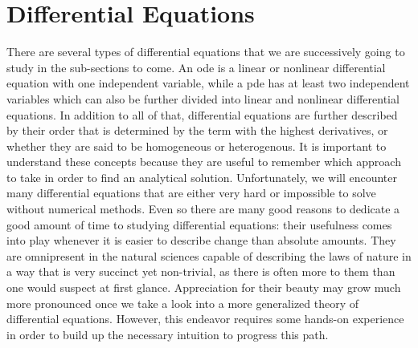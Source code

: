\section{Differential Equations}\label{sec-diff-eq}

There are several types of differential equations that we are successively going
to study in the sub-sections to come. An \gls{ode} is a linear or nonlinear
differential equation with one independent variable, while a \gls{pde} has at least
two independent variables which can also be further divided into linear and nonlinear
differential equations. In addition to all of that, differential equations are
further described by their order that is determined by the term with the highest
derivatives, or whether they are said to be homogeneous or heterogenous. It is
important to understand these concepts because they are useful to remember which
approach to take in order to find an analytical solution. Unfortunately, we will
encounter many differential equations that are either very hard or impossible to
solve without numerical methods. Even so there are many good reasons to dedicate
a good amount of time to studying differential equations: their usefulness
comes into play whenever it is easier to describe change than absolute amounts.
They are omnipresent in the natural sciences capable of describing the laws of
nature in a way that is very succinct yet non-trivial, as there is often more to
them than one would suspect at first glance. Appreciation for their beauty may
grow much more pronounced once we take a look into a more generalized theory of
differential equations. However, this endeavor requires some hands-on experience
in order to build up the necessary intuition to progress this path.
